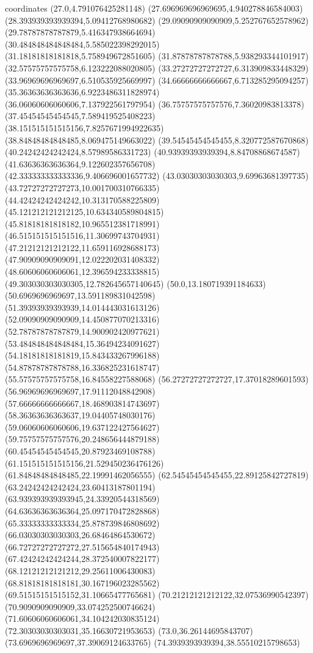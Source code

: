 coordinates {%
(27.0,4.791076425281148)
(27.696969696969695,4.940278846584003)
(28.393939393939394,5.09412768980682)
(29.09090909090909,5.252767652578962)
(29.78787878787879,5.416347938664694)
(30.484848484848484,5.585022398292015)
(31.18181818181818,5.758949672851605)
(31.87878787878788,5.938293344101917)
(32.57575757575758,6.123222088020805)
(33.27272727272727,6.313909833448329)
(33.96969696969697,6.510535925669997)
(34.66666666666667,6.713285295094257)
(35.36363636363636,6.9223486311828974)
(36.06060606060606,7.137922561797954)
(36.75757575757576,7.36020983813378)
(37.45454545454545,7.589419525408223)
(38.151515151515156,7.8257671994922635)
(38.84848484848485,8.069475149663022)
(39.54545454545455,8.320772587670868)
(40.24242424242424,8.57989586331723)
(40.93939393939394,8.84708868674587)
(41.63636363636364,9.122602357656708)
(42.333333333333336,9.406696001657732)
(43.03030303030303,9.69963681397735)
(43.72727272727273,10.001700310766335)
(44.42424242424242,10.313170588225809)
(45.121212121212125,10.634340589804815)
(45.81818181818182,10.965512381718991)
(46.515151515151516,11.30699743704931)
(47.21212121212122,11.659116928688173)
(47.90909090909091,12.022202031408332)
(48.60606060606061,12.396594233338815)
(49.303030303030305,12.782645657140645)
(50.0,13.180719391184633)
(50.6969696969697,13.591189831042598)
(51.39393939393939,14.014443031613126)
(52.09090909090909,14.450877070213316)
(52.78787878787879,14.900902420977621)
(53.484848484848484,15.36494234091627)
(54.18181818181819,15.843433267996188)
(54.87878787878788,16.336825231618747)
(55.57575757575758,16.84558227588068)
(56.27272727272727,17.37018289601593)
(56.96969696969697,17.91112048842908)
(57.66666666666667,18.468903814743697)
(58.36363636363637,19.04405748030176)
(59.06060606060606,19.637122427564627)
(59.75757575757576,20.248656444879188)
(60.45454545454545,20.87923469108788)
(61.151515151515156,21.529450236476126)
(61.84848484848485,22.19991462056555)
(62.54545454545455,22.89125842727819)
(63.24242424242424,23.60413187801194)
(63.939393939393945,24.33920544318569)
(64.63636363636364,25.097170472828868)
(65.33333333333334,25.878739846808692)
(66.03030303030303,26.68464864530672)
(66.72727272727272,27.515654840174943)
(67.42424242424244,28.372540007822177)
(68.12121212121212,29.25611006430083)
(68.81818181818181,30.167196023285562)
(69.51515151515152,31.10665477765681)
(70.21212121212122,32.07536990542397)
(70.9090909090909,33.074252500746624)
(71.60606060606061,34.104242030835124)
(72.30303030303031,35.16630721953653)
(73.0,36.26144695843707)
(73.6969696969697,37.39069124633765)
(74.3939393939394,38.55510215798653)
}
